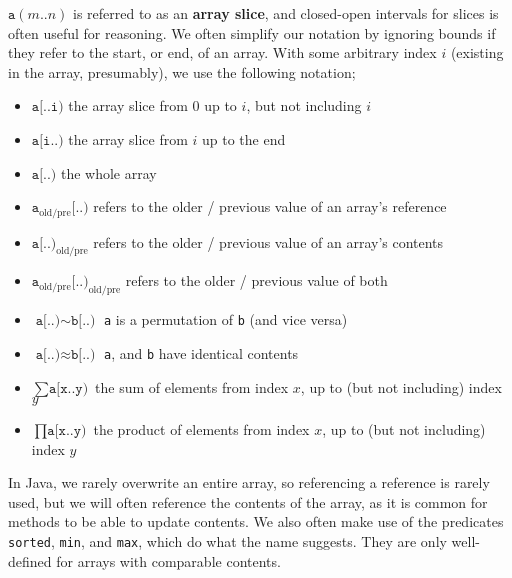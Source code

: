 \documentclass[a4paper, 12pt]{article}
\begin{document}
                $\texttt{a}(m..n)$ is referred to as an \textbf{array slice}, and closed-open intervals for slices is often useful for reasoning. We often simplify our notation by ignoring bounds if they refer to the start, or end, of an array. With some arbitrary index $i$ (existing in the array, presumably), we use the following notation;
                \begin{itemize}
                    \itemsep0em
                    \item $\texttt{a[..i)}$ \hfill the array slice from 0 up to $i$, but not including $i$
                    \item $\texttt{a[i..)}$ \hfill the array slice from $i$ up to the end
                    \item $\texttt{a[..)}$ \hfill the whole array
                    \item $\texttt{a}_\text{old/pre}\texttt{[..)}$ \hfill refers to the older / previous value of an array's reference
                    \item $\texttt{a[..)}_\text{old/pre}$ \hfill refers to the older / previous value of an array's contents
                    \item $\texttt{a}_\text{old/pre}\texttt{[..)}_\text{old/pre}$ \hfill refers to the older / previous value of both
                    \item $\texttt{a[..)} \sim \texttt{b[..)}$ \hfill \texttt{a} is a permutation of \texttt{b} (and vice versa)
                    \item $\texttt{a[..)} \approx \texttt{b[..)}$ \hfill \texttt{a}, and \texttt{b} have identical contents
                    \item $\sum \texttt{a[x..y)}$ \hfill the sum of elements from index $x$, up to (but not including) index $y$
                    \item $\prod \texttt{a[x..y)}$ \hfill the product of elements from index $x$, up to (but not including) index $y$
                \end{itemize}
                In Java, we rarely overwrite an entire array, so referencing a reference is rarely used, but we will often reference the contents of the array, as it is common for methods to be able to update contents. We also often make use of the predicates \texttt{sorted}, \texttt{min}, and \texttt{max}, which do what the name suggests. They are only well-defined for arrays with comparable contents.
                \medskip
\end{document}
